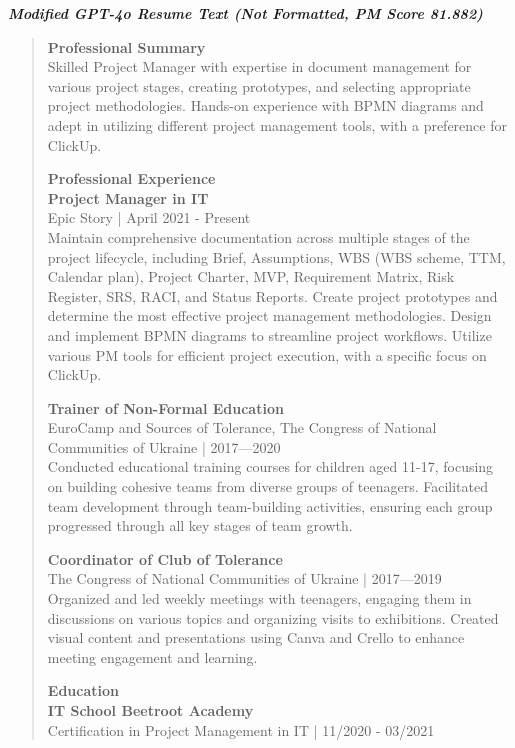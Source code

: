     \textbf{\textit{\large Modified GPT-4o Resume Text (Not Formatted, PM Score 81.882)}}
    \begin{quote}
        \textbf{Professional Summary} \\
        Skilled Project Manager with expertise in document management for various project stages, creating prototypes, and selecting appropriate project methodologies. Hands-on experience with BPMN diagrams and adept in utilizing different project management tools, with a preference for ClickUp.
        
        \textbf{Professional Experience} \\
        \textbf{Project Manager in IT} \\
        Epic Story | April 2021 - Present \\
        Maintain comprehensive documentation across multiple stages of the project lifecycle, including Brief, Assumptions, WBS (WBS scheme, TTM, Calendar plan), Project Charter, MVP, Requirement Matrix, Risk Register, SRS, RACI, and Status Reports. Create project prototypes and determine the most effective project management methodologies. Design and implement BPMN diagrams to streamline project workflows. Utilize various PM tools for efficient project execution, with a specific focus on ClickUp.
        
        \textbf{Trainer of Non-Formal Education} \\
        EuroCamp and Sources of Tolerance, The Congress of National Communities of Ukraine | 2017—2020 \\
        Conducted educational training courses for children aged 11-17, focusing on building cohesive teams from diverse groups of teenagers. Facilitated team development through team-building activities, ensuring each group progressed through all key stages of team growth.
        
        \textbf{Coordinator of Club of Tolerance} \\
        The Congress of National Communities of Ukraine | 2017—2019 \\
        Organized and led weekly meetings with teenagers, engaging them in discussions on various topics and organizing visits to exhibitions. Created visual content and presentations using Canva and Crello to enhance meeting engagement and learning.
        
        \textbf{Education} \\
        \textbf{IT School Beetroot Academy} \\
        Certification in Project Management in IT | 11/2020 - 03/2021
        

\end{quote}
